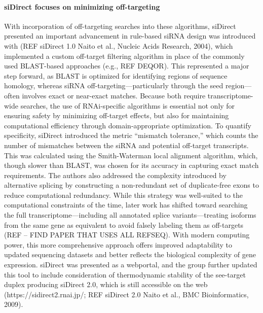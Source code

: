 \documentclass{report}
\begin{document}
\paragraph{siDirect focuses on minimizing off-targeting}  %
With incorporation of off-targeting searches into these algorithms, siDirect presented an important advancement in rule-based siRNA design was introduced with (REF siDirect 1.0 Naito et al., Nucleic Acids Research, 2004), which implemented a custom off-target filtering algorithm in place of the commonly used BLAST-based approaches (e.g., REF DEQOR). This represented a major step forward, as BLAST is optimized for identifying regions of sequence homology, whereas siRNA off-targeting—particularly through the seed region—often involves exact or near-exact matches. Because both require transcriptome-wide searches, the use of RNAi-specific algorithms is essential not only for ensuring safety by minimizing off-target effects, but also for maintaining computational efficiency through domain-appropriate optimization. To quantify specificity, siDirect introduced the metric “mismatch tolerance,” which counts the number of mismatches between the siRNA and potential off-target transcripts. This was calculated using the Smith-Waterman local alignment algorithm, which, though slower than BLAST, was chosen for its accuracy in capturing exact match requirements. The authors also addressed the complexity introduced by alternative splicing by constructing a non-redundant set of duplicate-free exons to reduce computational redundancy. While this strategy was well-suited to the computational constraints of the time, later work has shifted toward searching the full transcriptome—including all annotated splice variants—treating isoforms from the same gene as equivalent to avoid falsely labeling them as off-targets (REF – FIND PAPER THAT USES ALL REFSEQ). With modern computing power, this more comprehensive approach offers improved adaptability to updated sequencing datasets and better reflects the biological complexity of gene expression. siDirect was presented as a webportal, and the group further updated this tool to include consideration of thermodynamic stability of the see-target duplex producing siDirect 2.0, which is still accessible on the web (https://sidirect2.rnai.jp/; REF siDirect 2.0 Naito et al., BMC Bioinformatics, 2009).  
\end{document}

